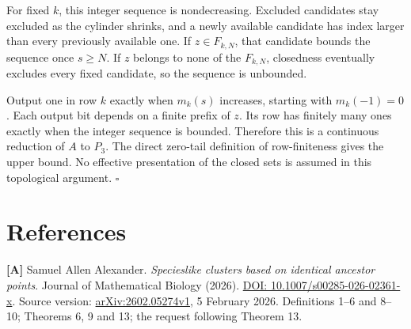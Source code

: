 \documentclass[
  11pt,
  letterpaper,
]{article}
\begin{document}
For fixed \(k\), this integer sequence is nondecreasing. Excluded
candidates stay excluded as the cylinder shrinks, and a newly available
candidate has index larger than every previously available one. If
\(z\in F_{k,N}\), that candidate bounds the sequence once \(s\geq N\).
If \(z\) belongs to none of the \(F_{k,N}\), closedness eventually
excludes every fixed candidate, so the sequence is unbounded.

Output one in row \(k\) exactly when \(m_k(s)\) increases, starting with
\(m_k(-1)=0\). Each output bit depends on a finite prefix of \(z\). Its
row has finitely many ones exactly when the integer sequence is bounded.
Therefore this is a continuous reduction of \(A\) to \(P_3\). The direct
zero-tail definition of row-finiteness gives the upper bound. No
effective presentation of the closed sets is assumed in this topological
argument. \hfill\(\square\)

\section{References}\label{references}

\textbf{{[}A{]}} Samuel Allen Alexander. \emph{Specieslike clusters
based on identical ancestor points}. Journal of Mathematical Biology
(2026). \href{https://doi.org/10.1007/s00285-026-02361-x}{DOI:
10.1007/s00285-026-02361-x}. Source version:
\href{https://arxiv.org/abs/2602.05274v1}{arXiv:2602.05274v1}, 5
February 2026. Definitions 1--6 and 8--10; Theorems 6, 9 and 13; the
request following Theorem 13.
\end{document}
